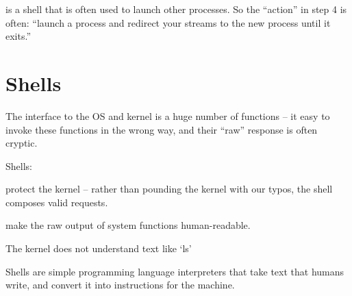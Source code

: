 \documentclass[landscape]{foils}
\begin{document}
 is a shell that is often used to launch other processes. 
So the ``action'' in step 4 is often: ``launch a process and redirect your streams to the new process until it exits.''


\myNewSlide
\section*{Shells}
The interface to the OS and kernel is a huge number of functions -- it easy to invoke these functions in the wrong way, and their ``raw'' response is often cryptic.

Shells:
\begin{compactenum}	
	\item protect the kernel  -- rather than pounding the kernel with our typos, the shell composes valid requests.
	\item make the raw output of system functions human-readable.
\end{compactenum}	

The kernel does not understand text like `ls'

Shells are simple programming language interpreters that take text that humans write, and convert it into instructions for the machine.
\end{document}
